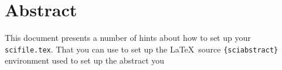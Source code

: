 \section*{Abstract}

This document presents a number of hints about how to set up your \texttt{scifile.tex}.
That you can use to set up the \LaTeX\ source \texttt{\{sciabstract\}} environment used to set up the abstract you
